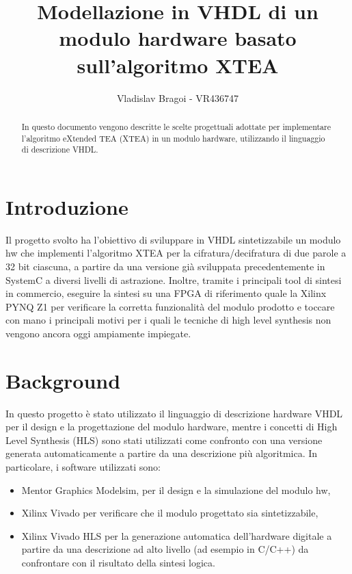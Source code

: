 \documentclass[]{IEEEtran}
\title{Modellazione in VHDL di un modulo hardware basato sull'algoritmo XTEA}
\author{Vladislav Bragoi - VR436747}
\begin{document}
\maketitle

\begin{abstract}
In questo documento vengono descritte le scelte progettuali adottate per implementare l'algoritmo eXtended TEA (XTEA) in
un modulo hardware, utilizzando il linguaggio di descrizione VHDL.

\end{abstract}

\section{Introduzione} \label{sec:intro}
Il progetto svolto ha l'obiettivo di sviluppare in VHDL sintetizzabile un modulo hw che implementi l'algoritmo XTEA per 
la cifratura/decifratura di due parole a 32 bit ciascuna, a partire da una versione gi\`a sviluppata precedentemente in 
SystemC a diversi livelli di astrazione.
Inoltre, tramite i principali tool di sintesi in commercio, eseguire la sintesi su una FPGA di riferimento quale la 
Xilinx PYNQ Z1 per verificare la corretta funzionalit\`a del modulo prodotto e toccare con mano i principali motivi per
i quali le tecniche di high level synthesis non vengono ancora oggi ampiamente impiegate.


\section{Background}
In questo progetto \`e stato utilizzato il linguaggio di descrizione hardware VHDL\cite{VHDL} per il design e la
progettazione del modulo hardware, mentre i concetti di High Level Synthesis (HLS) \cite{HLS} sono stati utilizzati
come confronto con una versione generata automaticamente a partire da una descrizione pi\`u algoritmica.
In particolare, i software utilizzati sono:
\begin{itemize}
	\item Mentor Graphics Modelsim, per il design e la simulazione del modulo hw,
	\item Xilinx Vivado per verificare che il modulo progettato sia sintetizzabile,
	\item Xilinx Vivado HLS per la generazione automatica dell'hardware digitale a partire da una descrizione ad alto 
			livello (ad esempio in C/C++) da confrontare con il risultato della sintesi logica.
\end{itemize}
\end{document}
